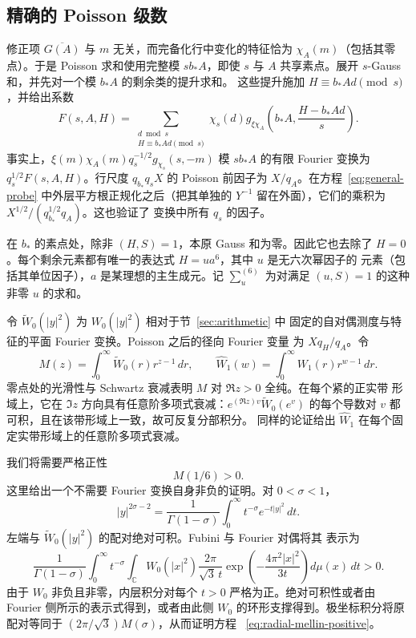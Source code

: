 \subsection{精确的 Poisson 级数}

修正项 $\overline{G(A)}$ 与 $m$ 无关，而完备化行中变化的特征恰为
$\chi_A(m)$（包括其零点）。于是 Poisson 求和使用完整模 $sb_*A$，即使 $s$ 与
$A$ 共享素点。展开 $s$-Gauss 和，并先对一个模 $b_*A$ 的剩余类的提升求和。
这些提升施加 $H\equiv b_*Ad\pmod s$，并给出系数
\begin{equation}\label{eq:local-F}
 F(s,A,H)=\sum_{\substack{d\bmod s\\H\equiv b_*Ad\pmod s}}
 \chi_s(d)g_{\xi\chi_A}\!\left(b_*A,\frac{H-b_*Ad}{s}\right).
\end{equation}
事实上，$\xi(m)\chi_A(m)q_s^{-1/2}g_{\chi_s}(s,-m)$ 模 $sb_*A$ 的有限 Fourier
变换为 $q_s^{1/2}F(s,A,H)$。行尺度 $q_{b_*}q_sX$ 的 Poisson 前因子为
$X/q_A$。在方程~\eqref{eq:general-probe} 中外层平方根正规化之后（把其单独的
$Y^{-1}$ 留在外面），它们的乘积为 $X^{1/2}/(q_{b_*}^{1/2}q_A)$。这也验证了
变换中所有 $q_s$ 的因子。

在 $b_*$ 的素点处，除非 $(H,S)=1$，本原 Gauss 和为零。因此它也去除了
$H=0$。每个剩余元素都有唯一的表达式 $H=ua^6$，其中 $u$ 是无六次幂因子的
元素（包括其单位因子），$a$ 是某理想的主生成元。记 $\sum_u^{(6)}$ 为对满足
$(u,S)=1$ 的这种非零 $u$ 的求和。

令 $\widetilde W_0(|y|^2)$ 为 $W_0(|y|^2)$ 相对于节~\ref{sec:arithmetic} 中
固定的自对偶测度与特征的平面 Fourier 变换。Poisson 之后的径向 Fourier 变量
为 $Xq_H/q_A$。令
\[
 M(z)=\int_0^\infty\widetilde W_0(r)r^{z-1}\,dr,
 \qquad
 \widehat W_1(w)=\int_0^\infty W_1(r)r^{w-1}\,dr.
\]
零点处的光滑性与 Schwartz 衰减表明 $M$ 对 $\Re z>0$ 全纯。在每个紧的正实带
形域上，它在 $\Im z$ 方向具有任意阶多项式衰减：$e^{(\Re z)v}\widetilde
W_0(e^v)$ 的每个导数对 $v$ 都可积，且在该带形域上一致，故可反复分部积分。
同样的论证给出 $\widehat W_1$ 在每个固定实带形域上的任意阶多项式衰减。

我们将需要严格正性
\begin{equation}\label{eq:radial-mellin-positive}
 M(1/6)>0.
\end{equation}
这里给出一个不需要 Fourier 变换自身非负的证明。对 $0<\sigma<1$，
\[
 |y|^{2\sigma-2}=\frac1{\Gamma(1-\sigma)}
             \int_0^\infty t^{-\sigma}e^{-t|y|^2}\,dt.
\]
左端与 $\widetilde W_0(|y|^2)$ 的配对绝对可积。Fubini 与 Fourier 对偶将其
表示为
\[
 \frac1{\Gamma(1-\sigma)}\int_0^\infty t^{-\sigma}
 \int_{\mathbb C}W_0(|x|^2)
       \frac{2\pi}{\sqrt3\,t}
       \exp\!\left(-\frac{4\pi^2|x|^2}{3t}\right)
                  d\mu(x)\,dt>0.
\]
由于 $W_0$ 非负且非零，内层积分对每个 $t>0$ 严格为正。绝对可积性或者由
Fourier 侧所示的表示式得到，或者由此侧 $W_0$ 的环形支撑得到。极坐标积分将原
配对等同于 $(2\pi/\sqrt3)M(\sigma)$，从而证明方程
~\eqref{eq:radial-mellin-positive}。

